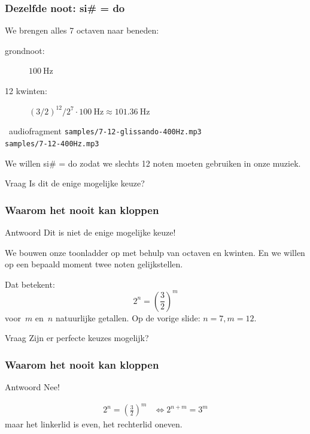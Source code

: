 \documentclass[compress, darktitle, framenumber, totalframenumber]{beamer}
\begin{document}
\begin{frame}
  \frametitle{Dezelfde noot: si\# = do}

  We brengen alles 7 octaven naar beneden:
  \begin{description}
    \item[grondnoot:] $\SI{100}{\hertz}$
    \item[12 kwinten:] $(3/2)^{12}/2^7\cdot\SI{100}{\hertz}\approx\SI{101.36}{\hertz}$
  \end{description}
  \pause
  \begin{block}{\twonotes\ audiofragment}
    \texttt{samples/7-12-glissando-400Hz.mp3} \\
    \texttt{samples/7-12-400Hz.mp3}
  \end{block}
  \pause
  We willen si\# = do zodat we slechts 12 noten moeten gebruiken in onze muziek.

  \begin{alertblock}{Vraag}
    Is dit de enige mogelijke keuze?
  \end{alertblock}
\end{frame}

\begin{frame}
  \frametitle{Waarom het nooit kan kloppen}

  \begin{block}{Antwoord}
    Dit is niet de enige mogelijke keuze!
  \end{block}
  We bouwen onze toonladder op met behulp van octaven en kwinten. En we willen op een bepaald moment twee noten gelijkstellen.

  \pause
  Dat betekent:
  \begin{equation}
    2^n=\left( \frac{3}{2} \right)^m
  \end{equation}
  voor~$m$ en~$n$ natuurlijke getallen. Op de vorige slide: $n=7,m=12$.
  \pause
  \begin{alertblock}{Vraag}
    Zijn er perfecte keuzes mogelijk?
  \end{alertblock}
\end{frame}

\begin{frame}
  \frametitle{Waarom het nooit kan kloppen}

  \begin{block}{Antwoord}
    Nee!
  \end{block}
  \pause
  \begin{equation}
    \begin{aligned}
      2^n=\left( \frac{3}{2} \right)^m&\Longleftrightarrow 2^{n+m}=3^m
    \end{aligned}
  \end{equation}
  maar het linkerlid is even, het rechterlid oneven.
\end{frame}
\end{document}
